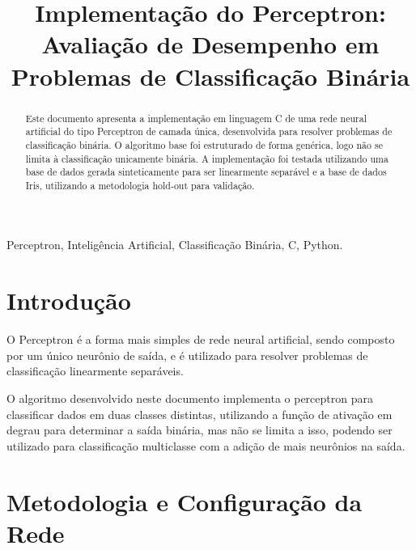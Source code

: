 \documentclass[conference]{IEEEtran}
\begin{document}
	\title{Implementação do Perceptron: Avaliação de Desempenho em Problemas de Classificação Binária\\}

	\author{
	}

	\maketitle

	\begin{abstract}

		Este documento apresenta a implementação em linguagem C de uma rede neural artificial do tipo Perceptron de camada única, desenvolvida para resolver problemas de classificação binária. O algoritmo base foi estruturado de forma genérica, logo não se limita à classificação unicamente binária. A implementação foi testada utilizando uma base de dados gerada sinteticamente para ser linearmente separável e a base de dados Iris, utilizando a metodologia hold-out para validação.

	\end{abstract}

	\begin{IEEEkeywords}

		Perceptron, Inteligência Artificial, Classificação Binária, C, Python.

	\end{IEEEkeywords}

	\section{Introdução}

		O Perceptron é a forma mais simples de rede neural artificial, sendo composto por um único neurônio de saída, e é utilizado para resolver problemas de classificação linearmente separáveis. 

		O algoritmo desenvolvido neste documento implementa o perceptron para classificar dados em duas classes distintas, utilizando a função de ativação em degrau para determinar a saída binária, mas não se limita a isso, podendo ser utilizado para classificação multiclasse com a adição de mais neurônios na saída.

	\section{Metodologia e Configuração da Rede}
\end{document}
